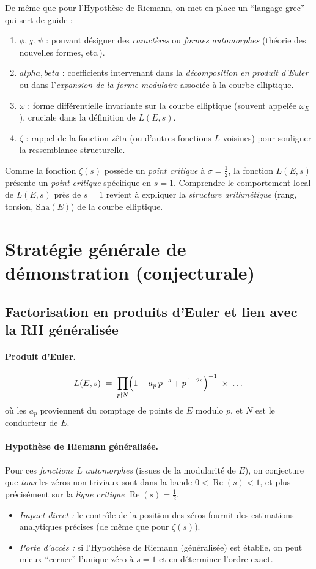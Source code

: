 \documentclass[11pt]{article}
\def\alpha{alpha}%
\def\beta{beta}%
\newcommand{\Sh}{\mathrm{Sha}}
\begin{document}
De même que pour l'Hypothèse de Riemann, on met en place un “langage grec” qui sert de guide :

\begin{enumerate}
  \item \(\phi, \chi, \psi\) : pouvant désigner des \emph{caractères} ou \emph{formes automorphes} (théorie des nouvelles formes, etc.).
  \item \(\alpha, \beta\) : coefficients intervenant dans la \emph{décomposition en produit d'Euler} ou dans l'\emph{expansion de la forme modulaire} associée à la courbe elliptique.
  \item \(\omega\) : forme différentielle invariante sur la courbe elliptique (souvent appelée \(\omega_E\)), cruciale dans la définition de $L(E,s)$.
  \item \(\zeta\) : rappel de la fonction zêta (ou d'autres fonctions $L$ voisines) pour souligner la ressemblance structurelle.
\end{enumerate}

Comme la fonction $\zeta(s)$ possède un \emph{point critique} à $\sigma=\tfrac12$, la fonction $L(E,s)$ présente un \emph{point critique} spécifique en $s=1$. Comprendre le comportement local de $L(E,s)$ près de $s=1$ revient à expliquer la \emph{structure arithmétique} (rang, torsion, \(\Sh(E)\)) de la courbe elliptique.

\section{Stratégie générale de démonstration (conjecturale)}

\subsection{Factorisation en produits d'Euler et lien avec la RH généralisée}

\paragraph{Produit d'Euler.}
\[
  L(E,s) \;=\; 
  \prod_{p \nmid N} \Bigl(1 - a_p\,p^{-s} + p^{\,1-2s}\Bigr)^{-1} \;\times\;\dots
\]
où les $a_p$ proviennent du comptage de points de $E$ modulo $p$, et $N$ est le conducteur de $E$.

\paragraph{Hypothèse de Riemann généralisée.}
Pour ces \emph{fonctions $L$ automorphes} (issues de la modularité de $E$), on conjecture que \emph{tous} les zéros non triviaux sont dans la bande $0 < \operatorname{Re}(s) < 1$, et plus précisément sur la \emph{ligne critique} $\operatorname{Re}(s)=\tfrac12$.  
\begin{itemize}
  \item \emph{Impact direct :} le contrôle de la position des zéros fournit des estimations analytiques précises (de même que pour $\zeta(s)$).  
  \item \emph{Porte d'accès :} si l'Hypothèse de Riemann (généralisée) est établie, on peut mieux “cerner” l'unique zéro à $s=1$ et en déterminer l'ordre exact.
\end{itemize}
\end{document}
